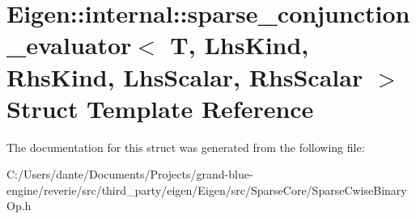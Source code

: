 \hypertarget{struct_eigen_1_1internal_1_1sparse__conjunction__evaluator}{}\section{Eigen\+::internal\+::sparse\+\_\+conjunction\+\_\+evaluator$<$ T, Lhs\+Kind, Rhs\+Kind, Lhs\+Scalar, Rhs\+Scalar $>$ Struct Template Reference}
\label{struct_eigen_1_1internal_1_1sparse__conjunction__evaluator}


The documentation for this struct was generated from the following file\+:\begin{DoxyCompactItemize}
\item 
C\+:/\+Users/dante/\+Documents/\+Projects/grand-\/blue-\/engine/reverie/src/third\+\_\+party/eigen/\+Eigen/src/\+Sparse\+Core/Sparse\+Cwise\+Binary\+Op.\+h\end{DoxyCompactItemize}
